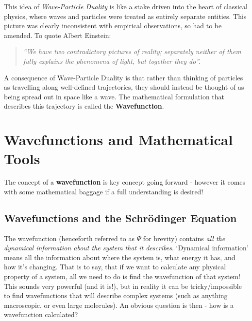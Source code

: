 \documentclass{memoir}[11pt,oneside,a4paper,openany]
\newcommand{\wf}{\ensuremath{\Psi}\xspace}
\begin{document}
This idea of \emph{Wave-Particle Duality} is like a stake driven into the heart of classical physics, where waves and particles were treated as entirely separate entities. This picture was clearly inconsistent with empirical observations, so had to be amended. To quote Albert Einstein:
\begin{quote}
	\textit{``We have two contradictory pictures of reality; separately neither of them fully explains the phenomena of light, but together they do''.}
\end{quote}
A consequence of Wave-Particle Duality is that rather than thinking of particles as travelling along well-defined trajectories, they should instead be thought of as being spread out in space like a wave. The mathematical formulation that describes this trajectory is called the \textbf{Wavefunction}.

\section{Wavefunctions and Mathematical Tools}
The concept of a \textbf{wavefunction} is key concept going forward - however it comes with some mathematical baggage if a full understanding is desired! 

\subsection{Wavefunctions and the Schr{\"o}dinger Equation}
The wavefunction (henceforth referred to as \wf for brevity) contains \emph{all the dynamical information about the system that it describes}. `Dynamical information' means all the information about where the system is, what energy it has, and how it's changing. That is to say, that if we want to calculate any physical property of a system, all we need to do is find the wavefunction of that system! This sounds very powerful (and it is!), but in reality it can be tricky/impossible to find wavefunctions that will describe complex systems (such as anything macroscopic, or even large molecules). An obvious question is then - how is a wavefunction calculated?
\end{document}
